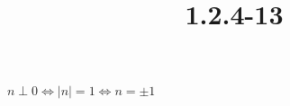 \documentclass{article}
\title{1.2.4-13}
\begin{document}
\maketitle

\( n \perp 0 \iff |n| = 1 \iff n = \pm 1 \)
\end{document}
